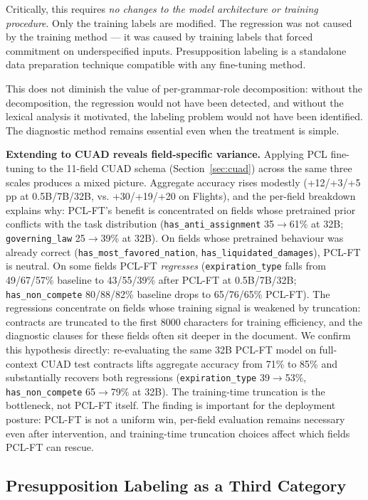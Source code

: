 \documentclass[11pt]{article}
\begin{document}
Critically, this requires \emph{no changes to the model architecture or training procedure}. Only the training labels are modified. The regression was not caused by the training method --- it was caused by training labels that forced commitment on underspecified inputs. Presupposition labeling is a standalone data preparation technique compatible with any fine-tuning method.

This does not diminish the value of per-grammar-role decomposition: without the decomposition, the regression would not have been detected, and without the lexical analysis it motivated, the labeling problem would not have been identified. The diagnostic method remains essential even when the treatment is simple.

\textbf{Extending to CUAD reveals field-specific variance.} Applying PCL fine-tuning to the 11-field CUAD schema (Section~\ref{sec:cuad}) across the same three scales produces a mixed picture. Aggregate accuracy rises modestly (+12/+3/+5 pp at 0.5B/7B/32B, vs. +30/+19/+20 on Flights), and the per-field breakdown explains why: PCL-FT's benefit is concentrated on fields whose pretrained prior conflicts with the task distribution (\texttt{has\_anti\_assignment} 35$\rightarrow$61\% at 32B; \texttt{governing\_law} 25$\rightarrow$39\% at 32B). On fields whose pretrained behaviour was already correct (\texttt{has\_most\_favored\_nation}, \texttt{has\_liquidated\_damages}), PCL-FT is neutral. On some fields PCL-FT \emph{regresses} (\texttt{expiration\_type} falls from 49/67/57\% baseline to 43/55/39\% after PCL-FT at 0.5B/7B/32B; \texttt{has\_non\_compete} 80/88/82\% baseline drops to 65/76/65\% PCL-FT). The regressions concentrate on fields whose training signal is weakened by truncation: contracts are truncated to the first 8000 characters for training efficiency, and the diagnostic clauses for these fields often sit deeper in the document. We confirm this hypothesis directly: re-evaluating the same 32B PCL-FT model on full-context CUAD test contracts lifts aggregate accuracy from 71\% to 85\% and substantially recovers both regressions (\texttt{expiration\_type} 39$\rightarrow$53\%, \texttt{has\_non\_compete} 65$\rightarrow$79\% at 32B). The training-time truncation is the bottleneck, not PCL-FT itself. The finding is important for the deployment posture: PCL-FT is not a uniform win, per-field evaluation remains necessary even after intervention, and training-time truncation choices affect which fields PCL-FT can rescue.

\subsection{Presupposition Labeling as a Third Category}
\end{document}
